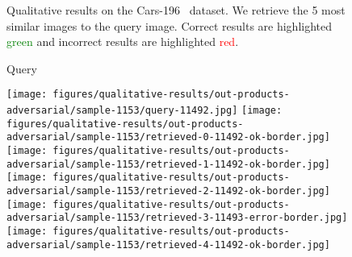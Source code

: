 \documentclass[10pt,journal,compsoc]{IEEEtran}
\begin{document}
\begin{figure*}[htbp]
\begin{center}
    \end{center}
    \caption{Qualitative results on the Cars-196~\cite{krause20133d} dataset. 
             We retrieve the 5 most similar images to the query image.
             Correct results are highlighted \textcolor{green}{green} and incorrect results are highlighted \textcolor{red}{red}.}
    \label{fig:qualitative-cars}
\end{figure*}\begin{figure*}[htbp]
    \begin{center}
    \begin{minipage}{0.16\textwidth}
    \centering
    Query
    \end{minipage}
    \begin{minipage}{0.16\textwidth}
    \end{minipage}
    \begin{minipage}{0.16\textwidth}
    \end{minipage}
    \begin{minipage}{0.16\textwidth}
    \end{minipage}
    \begin{minipage}{0.16\textwidth}
    \end{minipage}
    \begin{minipage}{0.16\textwidth}
    \end{minipage}
    \hspace{0.5cm}

    \texttt{[image: figures/qualitative-results/out-products-adversarial/sample-1153/query-11492.jpg]}
    \texttt{[image: figures/qualitative-results/out-products-adversarial/sample-1153/retrieved-0-11492-ok-border.jpg]}
    \texttt{[image: figures/qualitative-results/out-products-adversarial/sample-1153/retrieved-1-11492-ok-border.jpg]}
    \texttt{[image: figures/qualitative-results/out-products-adversarial/sample-1153/retrieved-2-11492-ok-border.jpg]}
    \texttt{[image: figures/qualitative-results/out-products-adversarial/sample-1153/retrieved-3-11493-error-border.jpg]}
    \texttt{[image: figures/qualitative-results/out-products-adversarial/sample-1153/retrieved-4-11492-ok-border.jpg]}


\end{center}
\end{figure*}
\end{document}
